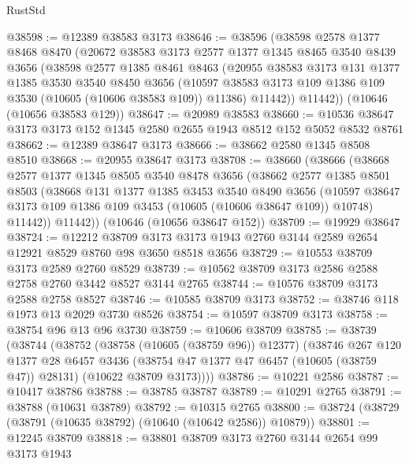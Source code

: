 \begin{lexlean}{RustStd}
\begin{coremodule}
@38598 := @12389 @38583 @3173
@38646 := @38596
    (@38598
      @2578
      @1377
      @8468
      @8470
      (@20672
        @38583
        @3173
        @2577
        @1377
        @1345
        @8465
        @3540
        @8439
        @3656
        (@38598
          @2577
          @1385
          @8461
          @8463
          (@20955
            @38583
            @3173
            @131
            @1377
            @1385
            @3530
            @3540
            @8450
            @3656
            (@10597 @38583 @3173 @109 @1386 @109 @3530 (@10605 (@10606 @38583 @109)) @11386)
            @11442))
        @11442))
    (@10646 (@10656 @38583 @129))
@38647 := @20989 @38583
@38660 := @10536 @38647 @3173 @3173 @152 @1345 @2580 @2655 @1943 @8512 @152 @5052 @8532 @8761
@38662 := @12389 @38647 @3173
@38666 := @38662 @2580 @1345 @8508 @8510
@38668 := @20955 @38647 @3173
@38708 := @38660
    (@38666
      (@38668
        @2577
        @1377
        @1345
        @8505
        @3540
        @8478
        @3656
        (@38662
          @2577
          @1385
          @8501
          @8503
          (@38668
            @131
            @1377
            @1385
            @3453
            @3540
            @8490
            @3656
            (@10597 @38647 @3173 @109 @1386 @109 @3453 (@10605 (@10606 @38647 @109)) @10748)
            @11442))
        @11442))
    (@10646 (@10656 @38647 @152))
@38709 := @19929 @38647
@38724 := @12212
    @38709
    @3173
    @3173
    @1943
    @2760
    @3144
    @2589
    @2654
    @12921
    @8529
    @8760
    @98
    @3650
    @8518
    @3656
@38729 := @10553 @38709 @3173 @2589 @2760 @8529
@38739 := @10562 @38709 @3173 @2586 @2588 @2758 @2760 @3442 @8527 @3144 @2765
@38744 := @10576 @38709 @3173 @2588 @2758 @8527
@38746 := @10585 @38709 @3173
@38752 := @38746 @118 @1973 @13 @2029 @3730 @8526
@38754 := @10597 @38709 @3173
@38758 := @38754 @96 @13 @96 @3730
@38759 := @10606 @38709
@38785 := @38739
    (@38744
      (@38752
        (@38758 (@10605 (@38759 @96)) @12377)
        (@38746
          @267
          @120
          @1377
          @28
          @6457
          @3436
          (@38754 @47 @1377 @47 @6457 (@10605 (@38759 @47)) @28131)
          (@10622 @38709 @3173))))
@38786 := @10221 @2586
@38787 := @10417 @38786
@38788 := @38785 @38787
@38789 := @10291 @2765
@38791 := @38788 (@10631 @38789)
@38792 := @10315 @2765
@38800 := @38724 (@38729 (@38791 (@10635 @38792) (@10640 (@10642 @2586)) @10879))
@38801 := @12245 @38709
@38818 := @38801
    @38709
    @3173
    @2760
    @3144
    @2654
    @99
    @3173
    @1943

\end{coremodule}
\end{lexlean}
